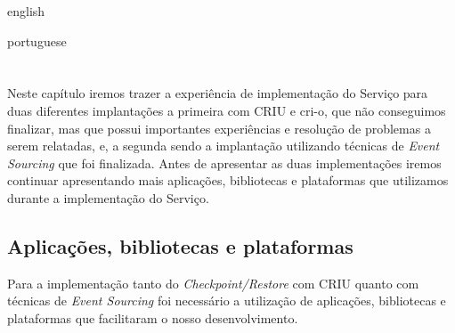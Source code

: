 

\begin{otherlanguage*}{english}


\begin{otherlanguage*}{portuguese}

\chapter{} \label{cap:implementacao:servico}

Neste capítulo iremos trazer a experiência de implementação do Serviço para duas
diferentes implantações a primeira com CRIU e cri-o, que não conseguimos finalizar,
mas que possui importantes experiências e resolução de problemas a serem relatadas, e,
a segunda sendo a implantação utilizando técnicas de \textit{Event Sourcing} que foi
finalizada. Antes de apresentar as duas implementações iremos continuar apresentando
mais aplicações, bibliotecas e plataformas que utilizamos durante a implementação do
Serviço.

\section{Aplicações, bibliotecas e plataformas}

Para a implementação tanto do \textit{Checkpoint/Restore} com CRIU quanto com técnicas
de \textit{Event Sourcing} foi necessário a utilização de aplicações, bibliotecas e
plataformas que facilitaram o nosso desenvolvimento.


\end{otherlanguage*}
\end{otherlanguage*}
